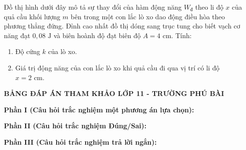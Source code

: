 \begin{ex}%
	Đồ thị hình dưới đây mô tả sự thay đổi của hàm động năng $W_{\text{đ}}$ theo li độ $x$ của quả cầu khối lượng $m$ bên trong một con lắc lò xo dao động điều hòa theo phương thẳng đứng. Đỉnh cao nhất đồ thị dóng sang trục tung cho biết vạch cơ năng đạt $0,08\text{ J}$ và biên hoành độ đạt biên độ $A = 4\text{ cm}$. Tính:
	\begin{enumerate}
		\item[a.] Độ cứng $k$ của lò xo.
		\item[b.] Giá trị động năng của con lắc lò xo khi quả cầu đi qua vị trí có li độ $x = 2\text{ cm}$.
	\end{enumerate}
\end{ex}


\newpage
\begin{center} \textbf{BẢNG ĐÁP ÁN THAM KHẢO LỚP 11 - TRƯỜNG PHÚ BÀI} \end{center}

\noindent \textbf{Phần I (Câu hỏi trắc nghiệm một phương án lựa chọn):}  

\noindent \textbf{Phần II (Câu hỏi trắc nghiệm Đúng/Sai):}

\noindent \textbf{Phần III (Câu hỏi trắc nghiệm trả lời ngắn):}

\label{B\thedeso}